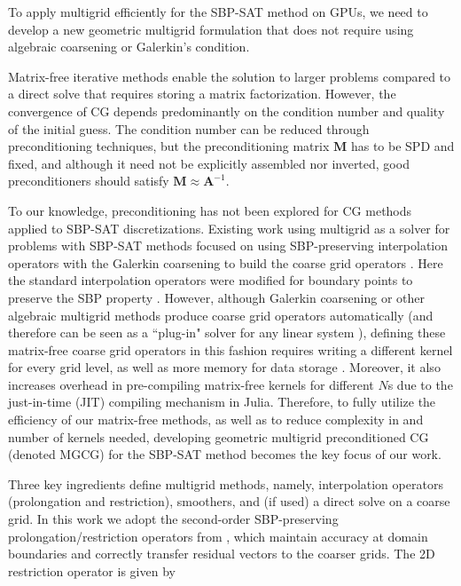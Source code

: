
To apply multigrid efficiently for the SBP-SAT method on GPUs, we need to develop a new geometric multigrid formulation that does not require using algebraic coarsening or Galerkin's condition.

Matrix-free iterative methods enable the solution to larger problems compared to a direct solve that requires storing a matrix factorization.  However, the convergence of CG depends predominantly on the condition number and quality of the initial guess. The condition number can be reduced through preconditioning techniques, but the preconditioning matrix $\mathbf{M}$ has to be SPD and fixed, and although it need not be explicitly assembled nor inverted, good preconditioners should satisfy $\mathbf{M} \approx \mathbf{A}^{-1}$. 


To our knowledge, preconditioning has not been explored for CG methods applied to SBP-SAT discretizations. 
Existing work using multigrid as a solver for problems with SBP-SAT methods focused on using SBP-preserving interpolation operators with the Galerkin coarsening to build the coarse grid operators \citep{Ruggiu2018}. Here the standard interpolation operators were modified for boundary points to preserve the SBP property \citep{Ruggiu2018}. However, although Galerkin coarsening or other algebraic multigrid methods produce coarse grid operators automatically (and therefore can be seen as a ``plug-in" solver for any linear system \citep{stuben2001review}), defining these matrix-free coarse grid operators in this fashion requires writing a different kernel for every grid level, as well as more memory for data storage \citep{brandt2006guide}. 
Moreover, it also increases overhead in pre-compiling matrix-free kernels for different $N$s due to the just-in-time (JIT) compiling mechanism in Julia. Therefore, to fully utilize the efficiency of our matrix-free methods, as well as to reduce complexity in and number of kernels needed, developing geometric multigrid preconditioned CG (denoted MGCG) for the SBP-SAT method becomes the key focus of our work. 

Three key ingredients define multigrid methods, namely, interpolation operators (prolongation and restriction), smoothers, and (if used) a direct solve on a coarse grid.  In this work we adopt the second-order SBP-preserving prolongation/restriction operators from \citep{Ruggiu2018}, which maintain accuracy at domain boundaries and correctly transfer residual vectors to the coarser grids. The 2D restriction operator is given by

